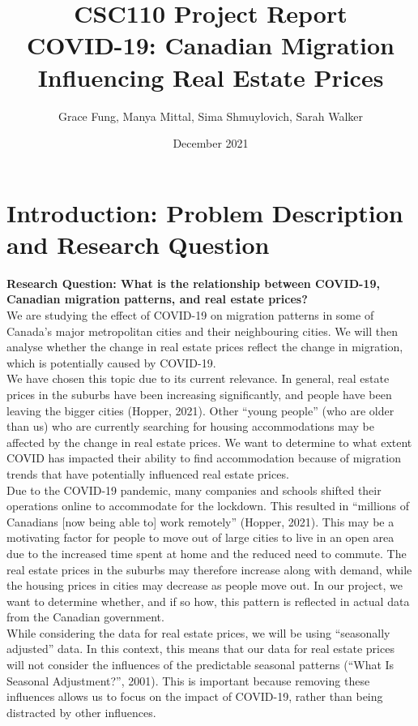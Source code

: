 \documentclass[fontsize=11pt]{article}
\title{CSC110 Project Report\\ COVID-19: Canadian Migration Influencing Real Estate Prices}
\author{Grace Fung, Manya Mittal, Sima Shmuylovich, Sarah Walker}
\date{December 2021}
\begin{document}
\maketitle

\section{Introduction: Problem Description and Research Question}

\textbf{Research Question: What is the relationship between COVID-19, Canadian migration patterns, and real estate prices?}\\

We are studying the effect of COVID-19 on migration patterns in some of Canada's major metropolitan cities and their neighbouring cities. We will then analyse whether the change in real estate prices reflect the change in migration, which is potentially caused by COVID-19. \\

We have chosen this topic due to its current relevance. In general, real estate prices in the suburbs have been increasing significantly, and people have been leaving the bigger cities (Hopper, 2021). Other “young people” (who are older than us) who are currently searching for housing accommodations may be affected by the change in real estate prices. We want to determine to what extent COVID has impacted their ability to find accommodation because of migration trends that have potentially influenced real estate prices. \\

Due to the COVID-19 pandemic, many companies and schools shifted their operations online to accommodate for the lockdown. This resulted in “millions of Canadians [now being able to] work remotely” (Hopper, 2021). This may be a motivating factor for people to move out of large cities  to live in an open area due to the increased time spent at home and the reduced need to commute. The real estate prices in the suburbs may therefore increase along with demand, while the housing prices in cities may decrease as people move out. In our project, we want to determine whether, and if so how, this pattern is reflected in actual data from the Canadian government. \\

While considering the data for real estate prices, we will be using “seasonally adjusted” data. In this context, this means that our data for real estate prices will not consider the influences of the predictable seasonal patterns (“What Is Seasonal Adjustment?”, 2001). This is important because removing these influences allows us to focus on the impact of COVID-19, rather than being distracted by other influences. \\
\end{document}
